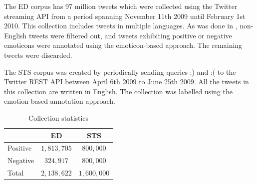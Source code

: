 \documentclass{sig-alternate}
\begin{document}
The ED corpus has 97 million tweets which were collected using the Twitter streaming API from a period spanning November 11th 2009 until February 1st 2010. This collection includes tweets in multiple languages. As was done in \cite{bifet2010}, non-English tweets were filtered out, and tweets exhibiting positive or negative emoticons were annotated using the emoticon-based approach. The remaining tweets were discarded.

The STS corpus was created by periodically sending queries :) and :( to the Twitter REST API between April 6th 2009 to June 25th 2009. All the tweets in this collection are written in English. The collection was labelled using the emotion-based annotation approach.




\begin{table}[htbp]
\begin{center}
\begin{tabular}{l|c|c}
\hline
 & ED & STS \\ \hline
Positive & $1,813,705$ & $800,000$  \\ 
Negative & $324,917$ & $800,000$  \\ \hline
Total & $2,138,622$ & $1,600,000$ \\ 
\end{tabular}
\end{center}
\caption{Collection statistics}
\label{tab:colstats}
\end{table}
\end{document}
